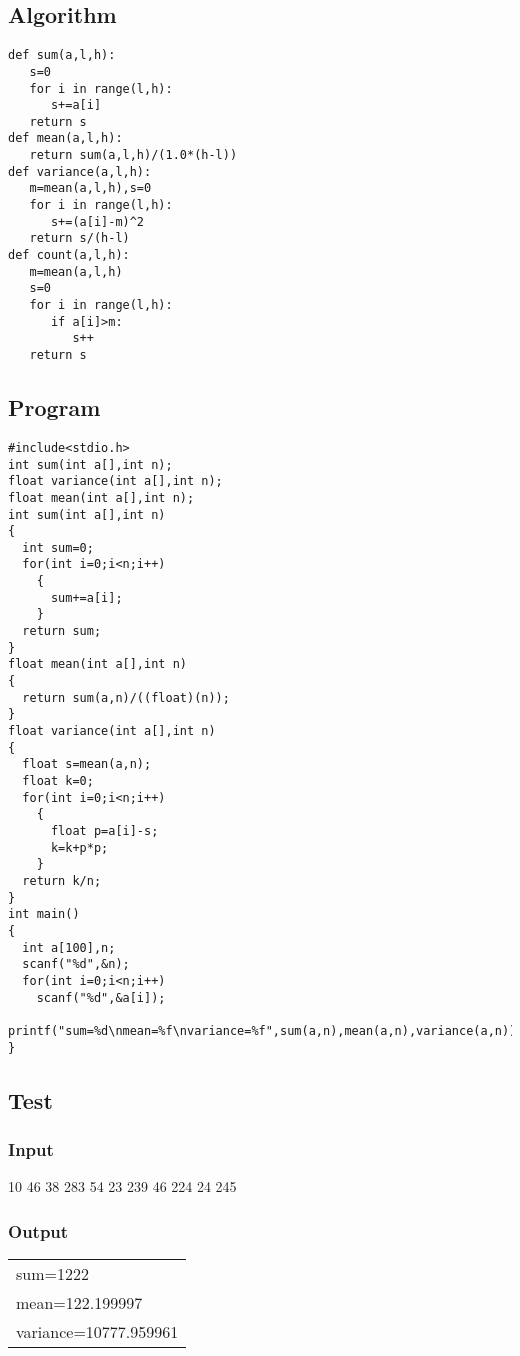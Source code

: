 \documentclass[11pt]{article}
\begin{document}
\subsection*{Algorithm}
\label{sec-4-3}
\begin{verbatim}
def sum(a,l,h):
   s=0
   for i in range(l,h):
      s+=a[i]
   return s
def mean(a,l,h):
   return sum(a,l,h)/(1.0*(h-l))
def variance(a,l,h):
   m=mean(a,l,h),s=0
   for i in range(l,h):
      s+=(a[i]-m)^2
   return s/(h-l)
def count(a,l,h):
   m=mean(a,l,h)
   s=0
   for i in range(l,h):
      if a[i]>m:
         s++
   return s
\end{verbatim}
\subsection*{Program}
\label{sec-4-4}
\begin{verbatim}
#include<stdio.h>
int sum(int a[],int n);
float variance(int a[],int n);
float mean(int a[],int n);
int sum(int a[],int n)
{
  int sum=0;
  for(int i=0;i<n;i++)
    {
      sum+=a[i];
    }
  return sum;
}
float mean(int a[],int n)
{
  return sum(a,n)/((float)(n));
}
float variance(int a[],int n)
{
  float s=mean(a,n);
  float k=0;
  for(int i=0;i<n;i++)
    {
      float p=a[i]-s;
      k=k+p*p;
    }
  return k/n;
}
int main()
{
  int a[100],n;
  scanf("%d",&n);
  for(int i=0;i<n;i++)
    scanf("%d",&a[i]);
  printf("sum=%d\nmean=%f\nvariance=%f",sum(a,n),mean(a,n),variance(a,n));
}
\end{verbatim}
\subsection*{Test}
\label{sec-4-5}
\subsubsection*{Input}
\label{sec-4-5-1}
10
46 38 283 54 23 239 46 224  24 245 
\subsubsection*{Output}
\label{sec-4-5-2}
\begin{center}
\begin{tabular}{l}
sum=1222\\
mean=122.199997\\
variance=10777.959961\\
\end{tabular}
\end{center}
\end{document}
